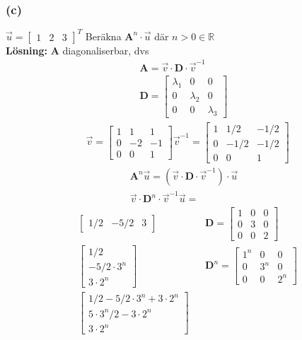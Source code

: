 \subsubsection{(c)}
$\vec{u} = \begin{bmatrix} 1 & 2 & 3 \end{bmatrix}^T$ Beräkna $\mathbf{A}^n \cdot \vec{u}$ där $n>0 \in \mathbb{R}$\\
\textbf{Lösning:} \textbf{A} diagonaliserbar, dvs
\begin{gather*}
    \mathbf{A} = \vec{v} \cdot \mathbf{D} \cdot \vec{v}^{-1}\\
    \mathbf{D} =
    \begin{bmatrix}
        \lambda_1 & 0 & 0\\
        0 & \lambda_2 & 0\\
        0 & 0 & \lambda_3
    \end{bmatrix}
\end{gather*}
\begin{align*}
& \vec{v} =
\begin{bmatrix}
    1 & 1 & 1\\
    0 & -2 & -1\\
    0 & 0 & 1
\end{bmatrix}
\vec{v}^{-1} =
\begin{bmatrix}
    1 & 1/2 & -1/2\\
    0 & -1/2 & -1/2\\
    0 & 0 & 1
\end{bmatrix}
\end{align*}
\begin{gather*}
    \mathbf{A}^n \vec{u} = (\vec{v} \cdot \mathbf{D} \cdot \vec{v}^{-1}) \cdot \vec{u} \\
    \vec{v} \cdot \mathbf{D}^n \cdot \vec{v}^{-1} \vec{u} =
\end{gather*}
\begin{align*}
&\begin{bmatrix} 1/2 & -5/2 & 3 \end{bmatrix}
&& \mathbf{D} = \begin{bmatrix} 1 & 0 & 0\\ 0 & 3 & 0\\0 & 0 & 2 \end{bmatrix}\\
&
\begin{bmatrix}
    1/2\\
    -5/2 \cdot 3^n\\
    3 \cdot 2^n
\end{bmatrix}
&& \mathbf{D}^n =
\begin{bmatrix}
    1^n & 0 & 0 \\
    0 & 3^n & 0\\
    0 & 0 & 2^n
\end{bmatrix}\\
&
\begin{bmatrix}
    1/2 - 5/2 \cdot 3^n + 3 \cdot 2^n\\
    5 \cdot 3^n/2 - 3 \cdot 2^n\\
    3 \cdot 2^n
\end{bmatrix}
\end{align*}




